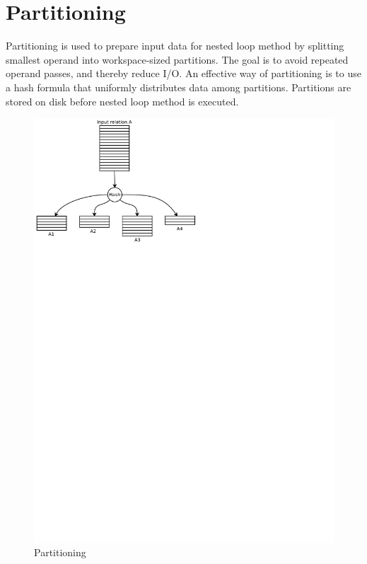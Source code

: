\section{Partitioning}
\label{sec:partitioning}

Partitioning is used to prepare input data for nested loop method by
splitting smallest operand into workspace-sized partitions. The goal
is to avoid repeated operand passes, and thereby reduce I/O. An
effective way of partitioning is to use a hash formula that uniformly
distributes data among partitions. Partitions are stored on disk
before nested loop method is executed.

\begin{figure}[H]
	\centering
	\includegraphics[scale=0.9,trim=0.25cm 21cm 9.80cm 0.1cm]{img/partitioning}
	\caption{Partitioning}
	\label{fig:partitioning}
\end{figure}

